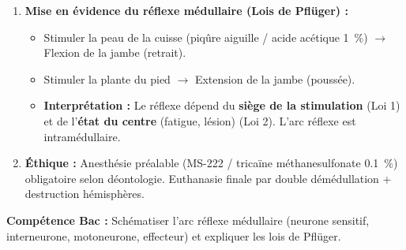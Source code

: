 \documentclass[11pt]{article}
\begin{document}
\begin{methode}
\begin{enumerate}
\begin{itemize}
    \end{itemize}
    \item \textbf{Mise en évidence du réflexe médullaire (Lois de Pflüger) :}
    \begin{itemize}
        \item Stimuler la peau de la cuisse (piqûre aiguille / acide acétique \SI{1}{\%}) $\rightarrow$ Flexion de la jambe (retrait).
        \item Stimuler la plante du pied $\rightarrow$ Extension de la jambe (poussée).
        \item \textbf{Interprétation :} Le réflexe dépend du \textbf{siège de la stimulation} (Loi 1) et de l'\textbf{état du centre} (fatigue, lésion) (Loi 2). L'arc réflexe est intramédullaire.
    \end{itemize}
    \item \textbf{Éthique :} Anesthésie préalable (MS-222 / tricaïne méthanesulfonate \SI{0,1}{\%}) obligatoire selon déontologie. Euthanasie finale par double démédullation + destruction hémisphères.
\end{enumerate}
\textbf{Compétence Bac :} Schématiser l'arc réflexe médullaire (neurone sensitif, interneurone, motoneurone, effecteur) et expliquer les lois de Pflüger.
\end{methode}
\end{document}
